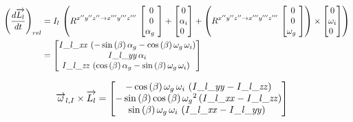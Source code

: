 \begin{align*}
\left(\frac{d\overrightarrow{L_{l}}}{dt}\right)_{rel}&=I_{l}\,\left(R^{x''y''z'' \rightarrow x'''y'''z'''}\,\begin{bmatrix}
0\\
0\\
\alpha_{g}\
\end{bmatrix}
+\begin{bmatrix}
0\\
\alpha_{i}\\
0\
\end{bmatrix}
+\left(R^{x''y''z'' \rightarrow x'''y'''z'''}\,\begin{bmatrix}
0\\
0\\
\omega_{g}\
\end{bmatrix}
\right)\times\begin{bmatrix}
0\\
\omega_{i}\\
0\
\end{bmatrix}
\right)\\
&=\begin{bmatrix}
{\it I\_l\_xx}\, \left( -\sin \left( \beta
 \right) \alpha_{g}-\cos \left( \beta \right) \omega_{g}\,\omega_{i}
 \right) \\ 
 {\it I\_l\_yy}\,\alpha_{i}
\\ 
%
{\it I\_l\_zz}\, \left( \cos \left( \beta
 \right) \alpha_{g}-\sin \left( \beta \right) \omega_{g}\,\omega_{i}
 \right) \
\end{bmatrix}
\end{align*}

\begin{equation*}
\begin{split}
\overrightarrow{\omega}_{l,I}\times \overrightarrow{L_{l}}&=\begin{bmatrix}
-\cos \left( \beta \right) \omega_{g}\,
\omega_{i}\, \left( {\it I\_l\_yy}-{\it I\_l\_zz} \right) 
\\ 
-\sin \left( \beta \right) \cos \left( \beta
 \right) {\omega_{g}}^{2} \left( {\it I\_l\_xx}-{\it I\_l\_zz}
 \right) \\ 
 \sin \left( \beta \right) \omega_{g}\,
\omega_{i}\, \left( {\it I\_l\_xx}-{\it I\_l\_yy} \right) \
\end{bmatrix}
\end{split}
\end{equation*}

